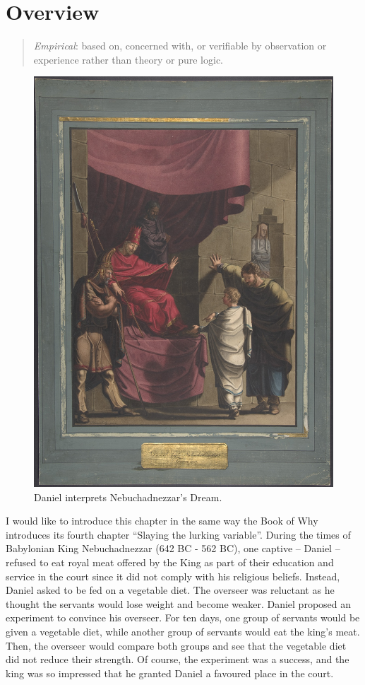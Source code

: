 \documentclass[
]{book}
\begin{document}
\hypertarget{overview-1}{%
\section{Overview}\label{overview-1}}

\begin{quote}
\emph{Empirical}: based on, concerned with, or verifiable by observation or experience rather than theory or pure logic.
\end{quote}

\begin{figure}

{\centering \includegraphics[width=0.33\linewidth]{Figures/Daniel_part_1} 

}

\caption{Daniel interprets Nebuchadnezzar's Dream.}\label{fig:daniel-part-one}
\end{figure}

I would like to introduce this chapter in the same way the Book of Why \citep{book-of-why} introduces its fourth chapter ``Slaying the lurking variable''. During the times of Babylonian King Nebuchadnezzar (642 BC - 562 BC), one captive -- Daniel -- refused to eat royal meat offered by the King as part of their education and service in the court since it did not comply with his religious beliefs. Instead, Daniel asked to be fed on a vegetable diet. The overseer was reluctant as he thought the servants would lose weight and become weaker. Daniel proposed an experiment to convince his overseer. For ten days, one group of servants would be given a vegetable diet, while another group of servants would eat the king's meat. Then, the overseer would compare both groups and see that the vegetable diet did not reduce their strength. Of course, the experiment was a success, and the king was so impressed that he granted Daniel a favoured place in the court.
\end{document}
